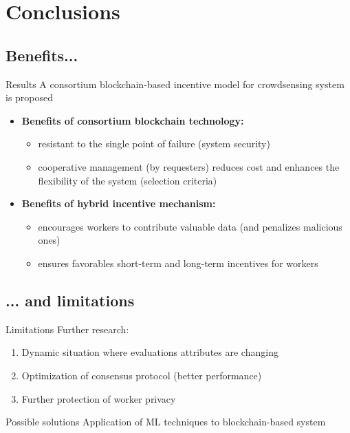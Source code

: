 

\section{Conclusions}

\subsection{Benefits...}

\begin{frame}{Results}
	A consortium blockchain-based incentive model for crowdsensing system is
proposed
  \begin{itemize}
  \item \textbf{Benefits of consortium blockchain technology:} 
  	\begin{itemize}
  		\item resistant to the single point of failure (system security)
  		\item cooperative management (by requesters) reduces cost and enhances the flexibility of the system (selection criteria)
  	\end{itemize}
  \item \textbf{Benefits of hybrid incentive mechanism:}
  	\begin{itemize}
  		\item encourages workers to contribute valuable data (and penalizes malicious ones)
  		\item ensures favorables short-term and long-term incentives for workers
  	\end{itemize}
  \end{itemize}
\end{frame}


\subsection{... and limitations}

\begin{frame}{Limitations}
	Further research:
  \begin{enumerate}
  \item Dynamic situation where evaluations attributes are changing
  \item Optimization of consensus protocol (better performance)
  \item Further protection of worker privacy
  \end{enumerate}
  \begin{block}{Possible solutions}
  Application of ML techniques to blockchain-based system
  \end{block}
\end{frame}